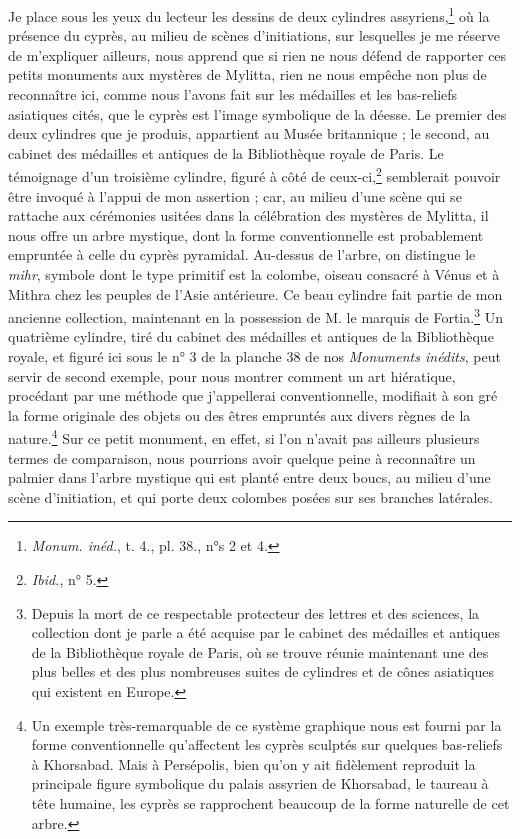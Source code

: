 \documentclass[a4paper, 11pt, oneside, polutonikogreek, french]{article}
\begin{document}
Je place sous les yeux du lecteur les dessins de deux cylindres assyriens,\footnote{\emph{Monum. inéd.}, t. 4., pl. 38., n°s 2 et 4.} où la présence du cyprès, au milieu de scènes d'initiations, sur lesquelles je me réserve de m'expliquer ailleurs, nous apprend que si rien ne nous défend de rapporter ces petits monuments aux mystères de Mylitta, rien ne nous empêche non plus de reconnaître ici, comme nous l'avons fait sur les médailles et les bas-reliefs asiatiques cités, que le cyprès est l'image symbolique de la déesse. Le premier des deux cylindres que je produis, appartient au Musée britannique ; le second, au cabinet des médailles et antiques de la Bibliothèque royale de Paris. Le témoignage d'un troisième cylindre, figuré à côté de ceux-ci,\footnote{\emph{Ibid.}, n° 5.} semblerait pouvoir être invoqué à l'appui de mon assertion ; car, au milieu d'une scène qui se rattache aux cérémonies usitées dans la célébration des mystères de Mylitta, il nous offre un arbre mystique, dont la forme conventionnelle est probablement empruntée à celle du cyprès pyramidal. Au-dessus de l'arbre, on distingue le \emph{mihr}, symbole dont le type primitif est la colombe, oiseau consacré à Vénus et à Mithra chez les peuples de l'Asie antérieure. Ce beau cylindre fait partie de mon ancienne collection, maintenant en la possession de M. le marquis de Fortia.\footnote{Depuis la mort de ce respectable protecteur des lettres et des sciences, la collection dont je parle a été acquise par le cabinet des médailles et antiques de la Bibliothèque royale de Paris, où se trouve réunie maintenant une des plus belles et des plus nombreuses suites de cylindres et de cônes asiatiques qui existent en Europe.} Un quatrième cylindre, tiré du cabinet des médailles et antiques de la Bibliothèque royale, et figuré ici sous le n° 3 de la planche 38 de nos \emph{Monuments inédits}, peut servir de second exemple, pour nous montrer comment un art hiératique, procédant par une méthode que j'appellerai conventionnelle, modifiait à son gré la forme originale des objets ou des êtres empruntés aux divers règnes de la nature.\footnote{Un exemple très-remarquable de ce système graphique nous est fourni par la forme conventionnelle qu'affectent les cyprès sculptés sur quelques bas-reliefs à Khorsabad. Mais à Persépolis, bien qu'on y ait fidèlement reproduit la principale figure symbolique du palais assyrien de Khorsabad, le taureau à tête humaine, les cyprès se rapprochent beaucoup de la forme naturelle de cet arbre.} Sur ce petit monument, en effet, si l'on n'avait pas ailleurs plusieurs termes de comparaison, nous pourrions avoir quelque peine à reconnaître un palmier dans l'arbre mystique qui est planté entre deux boucs, au milieu d'une scène d'initiation, et qui porte deux colombes posées sur ses branches latérales.
\end{document}
